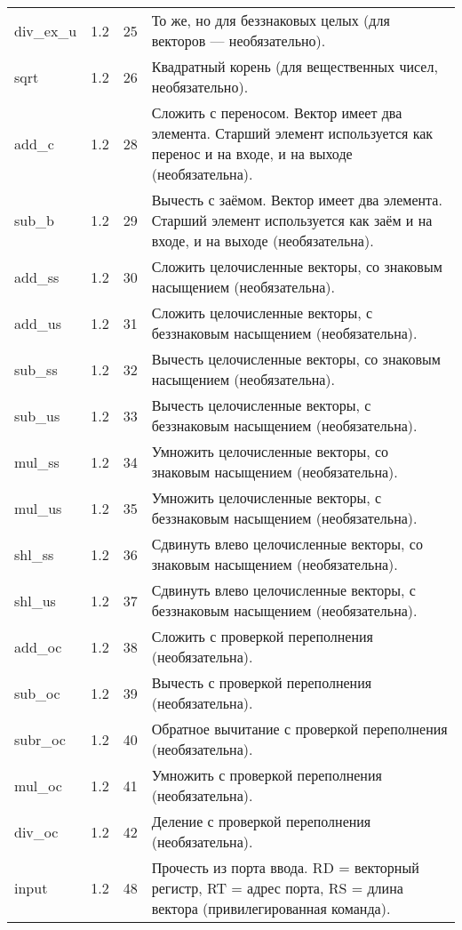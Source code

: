 \documentclass[forwardcom.tex]{subfiles}
\begin{document}
\begin{longtable}{|p{25mm}|p{16mm}|p{9mm}|p{99mm}|}
div\_ex\_u       & 1.2 & 25 & То же, но для беззнаковых целых (для векторов --- необязательно). \\
sqrt             & 1.2 & 26 & Квадратный корень (для вещественных чисел, необязательно). \\
add\_c           & 1.2 & 28 & Сложить с переносом. Вектор имеет два элемента.  Старший элемент используется как перенос и на входе, и на выходе (необязательна). \\
sub\_b           & 1.2 & 29 & Вычесть с заёмом. Вектор имеет два элемента.  Старший элемент используется как заём и на входе, и на выходе (необязательна). \\
add\_ss          & 1.2 & 30 & Сложить целочисленные векторы, со знаковым насыщением (необязательна). \\
add\_us          & 1.2 & 31 & Сложить целочисленные векторы, с беззнаковым насыщением (необязательна). \\
sub\_ss          & 1.2 & 32 & Вычесть целочисленные векторы, со знаковым насыщением (необязательна). \\
sub\_us          & 1.2 & 33 & Вычесть целочисленные векторы, с беззнаковым насыщением (необязательна). \\
mul\_ss          & 1.2 & 34 & Умножить целочисленные векторы, со знаковым насыщением (необязательна). \\
mul\_us          & 1.2 & 35 & Умножить целочисленные векторы, с беззнаковым насыщением (необязательна). \\
shl\_ss          & 1.2 & 36 & Сдвинуть влево целочисленные векторы, со знаковым насыщением (необязательна). \\
shl\_us          & 1.2 & 37 & Сдвинуть влево целочисленные векторы, с беззнаковым насыщением (необязательна). \\
add\_oc          & 1.2 & 38 & Сложить с проверкой переполнения (необязательна). \\
sub\_oc          & 1.2 & 39 & Вычесть с проверкой переполнения (необязательна). \\
subr\_oc         & 1.2 & 40 & Обратное вычитание с проверкой переполнения (необязательна). \\
mul\_oc          & 1.2 & 41 & Умножить с проверкой переполнения (необязательна). \\
div\_oc          & 1.2 & 42 & Деление с проверкой переполнения (необязательна). \\
input            & 1.2 & 48 & Прочесть из порта ввода. RD = векторный регистр, RT = адрес порта, RS = длина вектора (привилегированная команда). \\

\end{longtable}
\end{document}
